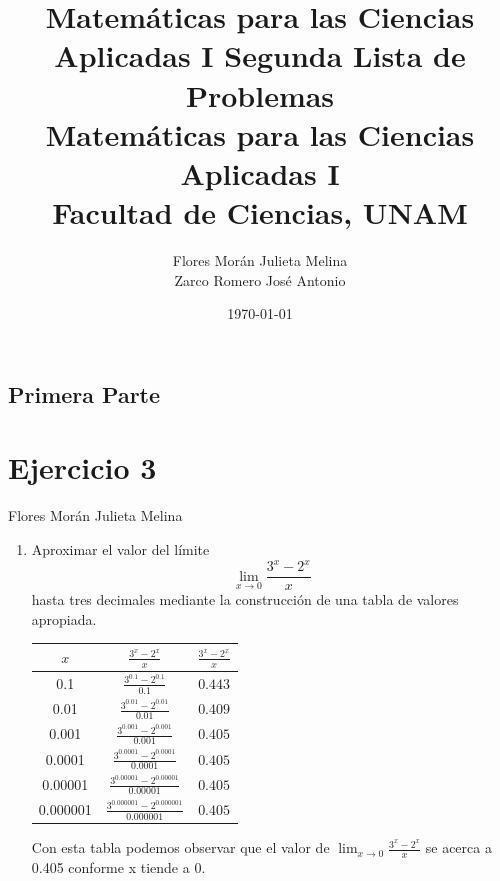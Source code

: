 \documentclass[12pt]{article}
\title{Matemáticas para las Ciencias Aplicadas I}
\title{
	Segunda Lista de Problemas \\
	\vspace{1ex}
	\large Matemáticas para las Ciencias Aplicadas I \\
	Facultad de Ciencias, UNAM}
\date{\today}
\author{Flores Morán Julieta Melina \\ Zarco Romero José Antonio}
\begin{document}
\maketitle
\subsection*{\centering \textbf{ \LARGE Primera Parte}}
\section{Ejercicio 3}
Flores Morán Julieta Melina \\
\begin{enumerate}[label=(\alph*)]
\item Aproximar el valor del límite
\[
\lim_{x \to 0}\frac{3^x-2^x}{x}
\]
hasta tres decimales mediante la construcción de una tabla de valores apropiada.\\
\begin{center}
\begin{tabular}{|c|c|c|}
\hline
\(x\) & \(\frac{3^x-2^x}{x}\) & \(\frac{3^x-2^x}{x}\) \\[0.8ex] 
\hline
0.1 & \(\frac{3^{0.1}-2^{0.1}}{0.1}\) & $0.443$\\ [0.8ex] 
0.01 & \(\frac{3^{0.01}-2^{0.01}}{0.01}\) & $0.409$ \\[0.8ex] 
0.001 & \(\frac{3^{0.001}-2^{0.001}}{0.001}\) & $0.405$ \\[0.8ex] 
0.0001 & \(\frac{3^{0.0001}-2^{0.0001}}{0.0001}\)  & $0.405$ \\[0.8ex] 
0.00001 & \(\frac{3^{0.00001}-2^{0.00001}}{0.00001}\)& $0.405$ \\[0.8ex] 
0.000001 & \(\frac{3^{0.000001}-2^{0.000001}}{0.000001}\)& $0.405$ \\[0.8ex] 
\hline
\end{tabular}
\end{center}
Con esta tabla podemos observar que el valor de $\lim_{x \to 0}\frac{3^x-2^x}{x}$ se acerca a 0.405 conforme x tiende a 0.


\end{enumerate}
\end{document}
